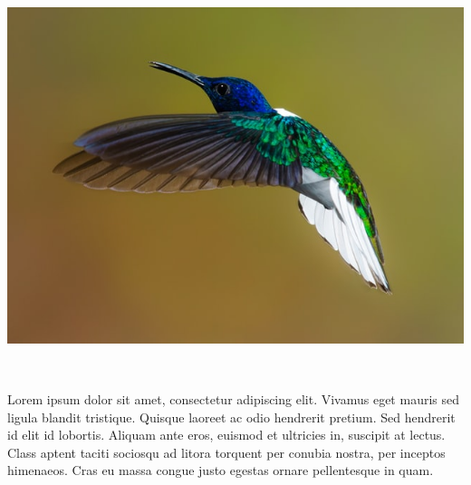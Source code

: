 \documentclass[11pt, a4paper]{article}
\begin{document}
\begin{example}
    \begin{gridlayout}{\textwidth}{11cm}
        \begin{row}{0.65}
            \begin{cell}{0.65}
                \includegraphics[width=\cellwidth]{img/bird.jpg}
            \end{cell}
            \begin{cell}{0.05}
                ~
            \end{cell}
            \begin{cell}{0.3}
                Lorem ipsum dolor sit amet, consectetur adipiscing elit. Vivamus eget mauris sed ligula blandit tristique. Quisque laoreet ac odio hendrerit pretium. Sed hendrerit id elit id lobortis. Aliquam ante eros, euismod et ultricies in, suscipit at lectus. Class aptent taciti sociosqu ad litora torquent per conubia nostra, per inceptos himenaeos. Cras eu massa congue justo egestas ornare pellentesque in quam.
            \end{cell}
        \end{row}
        \begin{row}{0.05}
            \begin{cell}{1}
                ~ 
            \end{cell}
        \end{row}
        \begin{row}{0.3}
            \begin{cell}{0.3}

\end{cell}
\end{row}
\end{gridlayout}
\end{example}
\end{document}
